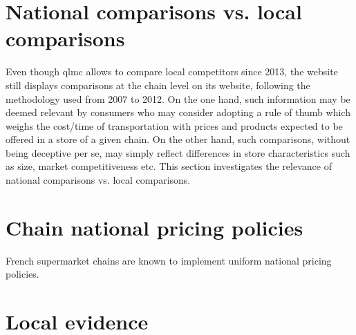 \documentclass[english]{article}
\begin{document}
\section{National comparisons vs. local comparisons}

Even though qlmc allows to compare local competitors since 2013, the website still displays comparisons at the chain level on its website, following the methodology used from 2007 to 2012. On the one hand, such information may be deemed relevant by consumers who may consider adopting a rule of thumb which weighs the cost/time of transportation with prices and products expected to be offered in a store of a given chain. On the other hand, such comparisons, without being deceptive per se, may simply reflect differences in store characteristics such as size, market competitiveness etc. This section investigates the relevance of national comparisons vs. local comparisons.

\section{Chain national pricing policies}

French supermarket chains are known to implement uniform national pricing policies.

\section{Local evidence}



\end{document}
